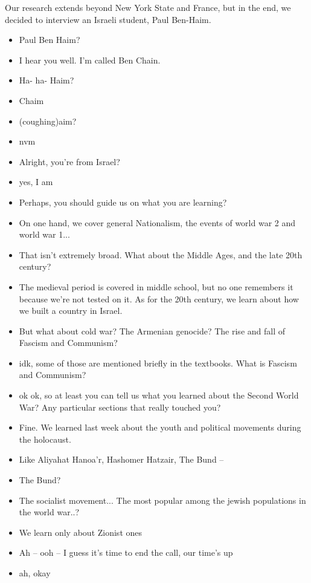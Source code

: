 \documentclass[]{../../../../tex/classes/styledArticle}
\begin{document}
	Our research extends beyond New York State and France, but in the end, we decided to interview an Israeli student, Paul Ben-Haim. 
	\begin{itemize}
		\item[(I)] Paul Ben Haim? 
		\item[(II)] I hear you well. I'm called Ben Chain. 
		\item[(I)] Ha- ha- Haim? 
		\item[(II)] Chaim
		\item[(I)] (coughing)aim? 
		\item[(II)] nvm
		\item[(I)] Alright, you're from Israel? 
		\item[(II)] yes, I am
		\item[(I)] Perhaps, you should guide us on what you are learning? 
		\item[(II)] On one hand, we cover general Nationalism, the events of world war 2 and world war 1... 
		\item[(I)] That isn't extremely broad. What about the Middle Ages, and the late 20th century?
		\item[(II)] The medieval period is covered in middle school, but no one remembers it because we're not tested on it. As for the 20th century, we learn about how we built a country in Israel. 
		\item[(I)] But what about cold war? The Armenian genocide? The rise and fall of Fascism and Communism? 
		\item[(II)] idk, some of those are mentioned briefly in the textbooks. What is Fascism and Communism? 
		\item[(I)] ok ok, so at least you can tell us what you learned about the Second World War? Any particular sections that really touched you? 
		\item[(II)] Fine. We learned last week about the youth and political movements during the holocaust. 
		\item[(I)] Like Aliyahat Hanoa'r, Hashomer Hatzair, The Bund --
		\item[(II)] The Bund? 
		\item[(I)] The socialist movement... The most popular among the jewish populations in the world war..?
		\item[(II)] We learn only about Zionist ones
		\item[(I)] Ah -- ooh -- I guess it's time to end the call, our time's up
		\item[(II)] ah, okay
	\end{itemize}
	
\end{document}

